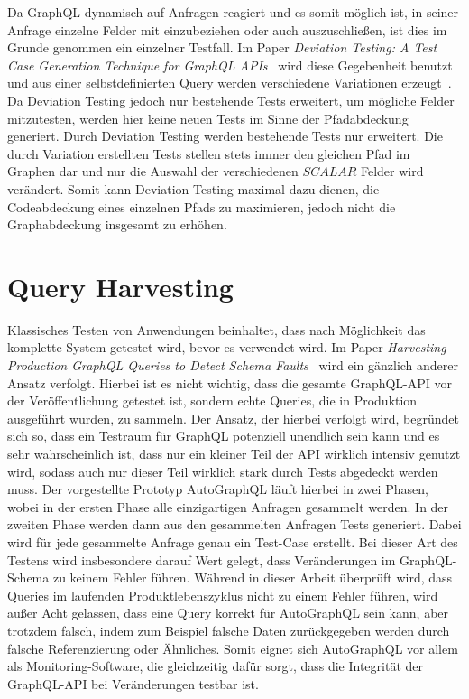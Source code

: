 Da GraphQL dynamisch auf Anfragen reagiert und es somit möglich ist, in seiner Anfrage einzelne Felder mit einzubeziehen
oder auch auszuschließen, ist dies im Grunde genommen ein einzelner Testfall.
Im Paper \textit{Deviation Testing: A Test Case Generation Technique for GraphQL APIs}~\cite{deviation} wird diese Gegebenheit benutzt und
aus einer selbstdefinierten Query werden verschiedene Variationen erzeugt~\cite[vgl. 3]{deviation}.
Da Deviation Testing jedoch nur bestehende Tests erweitert, um mögliche Felder mitzutesten, werden hier keine neuen Tests  im Sinne der Pfadabdeckung generiert.
Durch Deviation Testing werden bestehende Tests nur erweitert.
Die durch Variation erstellten Tests stellen stets immer den gleichen Pfad im Graphen dar und nur die Auswahl der verschiedenen $SCALAR$ Felder wird verändert.
Somit kann Deviation Testing maximal dazu dienen, die Codeabdeckung eines einzelnen Pfads zu maximieren, jedoch nicht die Graphabdeckung insgesamt zu erhöhen.

\section{Query Harvesting}

Klassisches Testen von Anwendungen beinhaltet, dass nach Möglichkeit das komplette System getestet wird, bevor es verwendet wird.
Im Paper \textit{Harvesting Production GraphQL Queries to Detect Schema Faults}~\cite{harvesting} wird ein gänzlich anderer Ansatz verfolgt.
Hierbei ist es nicht wichtig, dass die gesamte GraphQL-API vor der Veröffentlichung getestet ist, sondern echte Queries, die in Produktion ausgeführt wurden, zu sammeln.
Der Ansatz, der hierbei verfolgt wird, begründet sich so, dass ein Testraum für GraphQL potenziell unendlich sein kann und es sehr wahrscheinlich ist, dass nur ein kleiner
Teil der API wirklich intensiv genutzt wird, sodass auch nur dieser Teil wirklich stark durch Tests abgedeckt werden muss.
Der vorgestellte Prototyp AutoGraphQL läuft hierbei in zwei Phasen, wobei in der ersten Phase alle einzigartigen Anfragen gesammelt werden.
In der zweiten Phase werden dann aus den gesammelten Anfragen Tests generiert.
Dabei wird für jede gesammelte Anfrage genau ein Test-Case erstellt.
Bei dieser Art des Testens wird insbesondere darauf Wert gelegt, dass Veränderungen im GraphQL-Schema zu keinem Fehler führen.
Während in dieser Arbeit überprüft wird, dass Queries im laufenden Produktlebenszyklus nicht zu einem Fehler führen, wird außer Acht gelassen,
dass eine Query korrekt für AutoGraphQL sein kann, aber trotzdem falsch, indem zum Beispiel falsche Daten zurückgegeben werden
durch falsche Referenzierung oder Ähnliches.
Somit eignet sich AutoGraphQL vor allem als Monitoring-Software, die gleichzeitig dafür sorgt, dass die Integrität der GraphQL-API bei Veränderungen
testbar ist.

